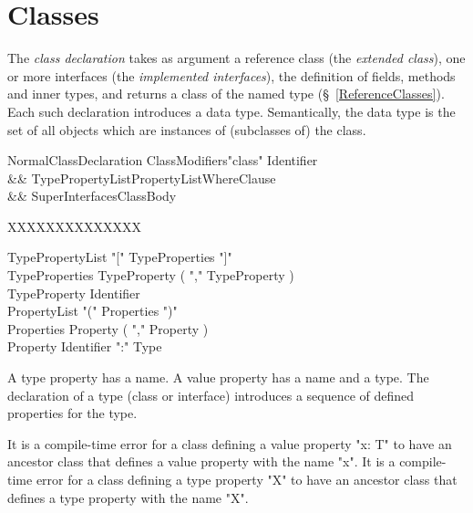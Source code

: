 \chapter{Classes}
\label{XtenClasses}

The {\em class declaration} takes
as argument a reference class (the {\em extended class}), one or more
interfaces (the {\em implemented interfaces}), the definition of
fields, methods and inner types, and returns a class of the named type
(\S~\ref{ReferenceClasses}). Each such declaration introduces a data
type. Semantically, the data type is the set of all objects which are
instances of (subclasses of) the class.

\begin{grammar}
NormalClassDeclaration \:
      ClassModifiers\opt \xcd"class" Identifier  \\
   && TypePropertyList\opt PropertyList\opt WhereClause\opt \\
   && Super\opt Interfaces\opt ClassBody \\
\end{grammar}


XXXXXXXXXXXXXX

\begin{grammar}
TypePropertyList     \:  \xcd"[" TypeProperties \xcd"]" \\
TypeProperties       \:  TypeProperty
                     ( \xcd"," TypeProperty )\star \\
TypeProperty         \:  Identifier     \\
PropertyList     \:  \xcd"(" Properties \xcd")" \\
Properties       \:  Property ( \xcd"," Property )\star \\
Property         \:  Identifier \xcd":" Type \\
\end{grammar}

A type property has a name.
A value property has a name and a type. The declaration of a type (class or
interface) introduces a sequence of defined properties for the type. 

\begin{staticrule*}
It is a compile-time error for a class
defining a value property \xcd"x: T" to have an ancestor class that defines
a value property with the name \xcd"x".  
It is a compile-time error for a class
defining a type property \xcd"X" to have an ancestor class that defines
a type property with the name \xcd"X".   
\end{staticrule*}

